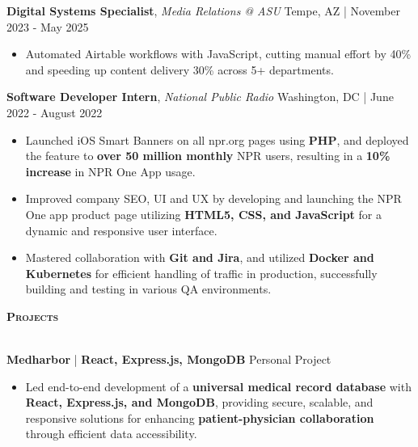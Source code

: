 \documentclass[10pt]{article}
\newcommand{\lineunder} {
    \vspace*{-8pt} \\
    \hspace*{-18pt} \hrulefill \\
}
\newcommand{\header} [1] {
    {\hspace*{-15pt}\vspace*{3pt} \textsc{#1}}
    \vspace*{-2pt} \lineunder
}
\begin{document}
\textbf{Digital Systems Specialist}, \textit{Media Relations @ ASU} \hfill Tempe, AZ | November 2023 - May 2025\\
\vspace{-1mm}
\begin{itemize}[leftmargin=5mm, itemsep=0mm]
  \item Automated Airtable workflows with JavaScript, cutting manual effort by 40\% and speeding up content delivery 30\% across 5+ departments.
\end{itemize} 



\textbf{Software Developer Intern}, \textit{National Public Radio}     \hfill Washington, DC | June 2022 - August 2022\\
\vspace{-1mm}
\begin{itemize}[leftmargin=5mm, itemsep=0mm]
  
  \item Launched iOS Smart Banners on all npr.org pages using \textbf{PHP}, and deployed the feature to \textbf{over 50 million monthly} NPR users, resulting in a \textbf{10\% increase} in NPR One App usage.
  \item Improved company SEO, UI and UX by developing and launching the NPR One app product page utilizing \textbf{HTML5, CSS, and JavaScript} for a dynamic and responsive user interface.
  \item Mastered collaboration with \textbf{Git and Jira}, and utilized \textbf{Docker and Kubernetes} for efficient handling of traffic in production, successfully building and testing in various QA environments.
\end{itemize}


\header{\textbf{Projects}}
\vspace{0.5mm}

\textbf{Medharbor} | \textbf{React, Express.js, MongoDB} \hfill Personal Project \\
\vspace{-1mm}
\begin{itemize}[leftmargin=5mm, itemsep=0mm]
  \item Led end-to-end development of a \textbf{universal medical record database} with \textbf{React, Express.js, and MongoDB}, providing secure, scalable, and responsive solutions for enhancing \textbf{patient-physician collaboration} through efficient data accessibility.
\end{itemize}
\end{document}
